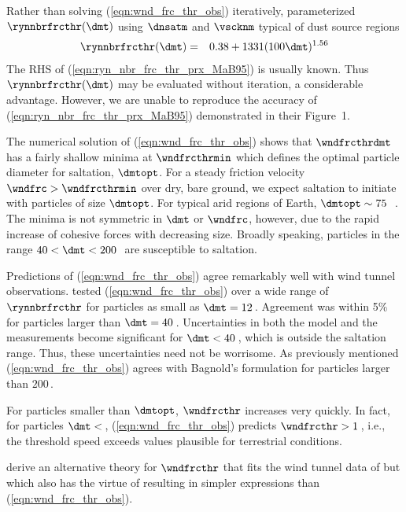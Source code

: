 \documentclass[12pt,twoside]{book}
\begin{document}
Rather than solving (\ref{eqn:wnd_frc_thr_obs}) iteratively, 
\cite{MaB95} parameterized $\rynnbrfrcthr(\dmt)$ using $\dnsatm$ and
$\vscknm$ typical of dust source regions 
\begin{eqnarray}
\rynnbrfrcthr(\dmt) & = & 0.38 + 1331 (100\dmt)^{1.56}
\label{eqn:ryn_nbr_frc_thr_prx_MaB95}
\end{eqnarray}
The RHS of (\ref{eqn:ryn_nbr_frc_thr_prx_MaB95}) is usually known.
Thus $\rynnbrfrcthr(\dmt)$ may be evaluated without iteration, a
considerable advantage.   
However, we are unable to reproduce the accuracy of %
(\ref{eqn:ryn_nbr_frc_thr_prx_MaB95}) demonstrated in their Figure~1. 

The numerical solution of (\ref{eqn:wnd_frc_thr_obs}) shows that
$\wndfrcthrdmt$ has a fairly shallow minima at $\wndfrcthrmin$ which  
defines the optimal particle diameter for saltation, $\dmtopt$.
For a steady friction velocity $\wndfrc > \wndfrcthrmin$ over dry,
bare ground, we expect saltation to initiate with particles of size
$\dmtopt$.
For typical arid regions of Earth, $\dmtopt \sim 75$\,\um\
\cite[][]{IvW82,Pye87,SRL96,MBA97}.
The minima is not symmetric in $\dmt$ or $\wndfrc$, however, due to
the rapid increase of cohesive forces with decreasing size.
Broadly speaking, particles in the range $40 < \dmt < 200$\,\um\ are
susceptible to saltation.

Predictions of (\ref{eqn:wnd_frc_thr_obs}) agree remarkably well with
wind tunnel observations. 
\cite{IvW82} tested (\ref{eqn:wnd_frc_thr_obs}) over a wide range of
$\rynnbrfrcthr$ for particles as small as $\dmt = 12$\,\um. 
Agreement was within 5\% for particles larger than $\dmt = 40$\,\um.
Uncertainties in both the model and the measurements become
significant for $\dmt < 40$\,\um, which is outside the saltation
range. 
Thus, these uncertainties need not be worrisome.
As previously mentioned (\ref{eqn:wnd_frc_thr_obs}) agrees with 
Bagnold's formulation for particles larger than $200$\,\um.

For particles smaller than $\dmtopt$, $\wndfrcthr$ increases very
quickly. 
In fact, for particles $\dmt < $\,\um, (\ref{eqn:wnd_frc_thr_obs})
predicts $\wndfrcthr > 1$\,\mxs, i.e., the threshold speed exceeds
values plausible for terrestrial conditions.

\cite{ShL00} derive an alternative theory for $\wndfrcthr$ that fits
the wind tunnel data of \cite{IvW82} but which also has the virtue of 
resulting in simpler expressions than (\ref{eqn:wnd_frc_thr_obs}).
\end{document}
